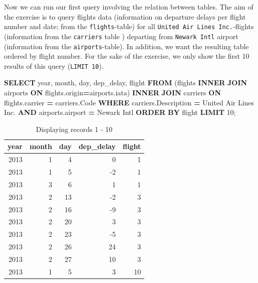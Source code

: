 \documentclass[
  12pt,
]{style/krantz}
\newenvironment{Shaded}{\begin{snugshade}}{\end{snugshade}}
\newcommand{\DataTypeTok}[1]{\textcolor[rgb]{0.13,0.29,0.53}{#1}}
\newcommand{\DecValTok}[1]{\textcolor[rgb]{0.00,0.00,0.81}{#1}}
\newcommand{\KeywordTok}[1]{\textcolor[rgb]{0.13,0.29,0.53}{\textbf{#1}}}
\newcommand{\NormalTok}[1]{#1}
\newcommand{\OperatorTok}[1]{\textcolor[rgb]{0.81,0.36,0.00}{\textbf{#1}}}
\newcommand{\StringTok}[1]{\textcolor[rgb]{0.31,0.60,0.02}{#1}}
\begin{document}
Now we can run our first query involving the relation between tables. The aim of the exercise is to query flights data (information on departure delays per flight number and date; from the \texttt{flights}-table) for all \texttt{United\ Air\ Lines\ Inc.}-flights (information from the \texttt{carriers} table ) departing from \texttt{Newark\ Intl} airport (information from the \texttt{airports}-table). In addition, we want the resulting table ordered by flight number. For the sake of the exercise, we only show the first 10 results of this query (\texttt{LIMIT\ 10}).

\begin{Shaded}
\begin{Highlighting}[]
\KeywordTok{SELECT} 
\DataTypeTok{year}\NormalTok{,}
\DataTypeTok{month}\NormalTok{, }
\DataTypeTok{day}\NormalTok{,}
\NormalTok{dep\_delay,}
\NormalTok{flight}
\KeywordTok{FROM}\NormalTok{ (flights }\KeywordTok{INNER} \KeywordTok{JOIN}\NormalTok{ airports }\KeywordTok{ON}\NormalTok{ flights.origin}\OperatorTok{=}\NormalTok{airports.iata) }
\KeywordTok{INNER} \KeywordTok{JOIN}\NormalTok{ carriers }\KeywordTok{ON}\NormalTok{ flights.carrier }\OperatorTok{=}\NormalTok{ carriers.Code}
\KeywordTok{WHERE}\NormalTok{ carriers.Description }\OperatorTok{=} \StringTok{\textquotesingle{}United Air Lines Inc.\textquotesingle{}}
\KeywordTok{AND}\NormalTok{ airports.airport }\OperatorTok{=} \StringTok{\textquotesingle{}Newark Intl\textquotesingle{}}
\KeywordTok{ORDER} \KeywordTok{BY}\NormalTok{ flight}
\KeywordTok{LIMIT} \DecValTok{10}\NormalTok{;}
\end{Highlighting}
\end{Shaded}

\begin{table}

\caption{\label{tab:unnamed-chunk-125}Displaying records 1 - 10}
\centering
\begin{tabular}[t]{r|r|r|r|r}
\hline
year & month & day & dep\_delay & flight\\
\hline
2013 & 1 & 4 & 0 & 1\\
\hline
2013 & 1 & 5 & -2 & 1\\
\hline
2013 & 3 & 6 & 1 & 1\\
\hline
2013 & 2 & 13 & -2 & 3\\
\hline
2013 & 2 & 16 & -9 & 3\\
\hline
2013 & 2 & 20 & 3 & 3\\
\hline
2013 & 2 & 23 & -5 & 3\\
\hline
2013 & 2 & 26 & 24 & 3\\
\hline
2013 & 2 & 27 & 10 & 3\\
\hline
2013 & 1 & 5 & 3 & 10\\
\hline
\end{tabular}
\end{table}
\end{document}
